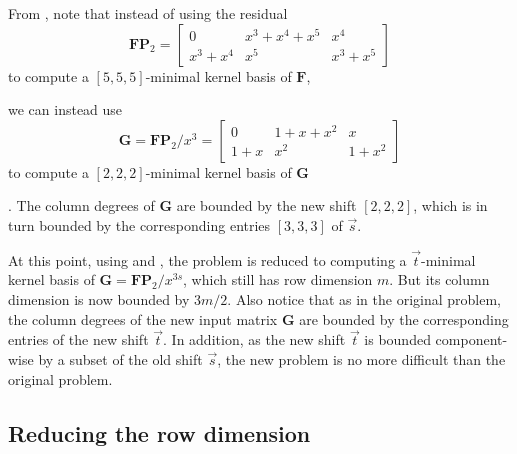 \begin{example}
\label{exm:reducingDegree}From ,
note that instead of using the residual 
\[
\mathbf{F}\mathbf{P}_{2}=\left[\begin{array}{ccc}
0 & x^{3}+x^{4}+x^{5} & x^{4}\\
x^{3}+x^{4} & x^{5} & x^{3}+x^{5}
\end{array}\right]
\]
 to compute a $[5,5,5]$-minimal kernel basis of $\mathbf{F}$,%
\begin{comment}
$\left(\mathbf{F}\mathbf{P}_{2},\tau,[5,5,5]\right)$-basis,
\end{comment}
{} we can instead use 
\[
\mathbf{G}=\mathbf{F}\mathbf{P}_{2}/x^{3}=\left[\begin{array}{ccc}
0 & 1+x+x^{2} & x\\
1+x & x^{2} & 1+x^{2}
\end{array}\right]
\]
 to compute a $[2,2,2]$-minimal kernel basis of $\mathbf{G}$%
\begin{comment}
$\left(\mathbf{G},\tau,[2,2,2]\right)$-basis
\end{comment}
. The column degrees of $\mathbf{G}$ are bounded by the new shift
$\left[2,2,2\right]$, which is in turn bounded by the corresponding
entries $\left[3,3,3\right]$ of $\vec{s}$. 
\end{example}
At this point, using 
and , the problem
is reduced to computing a $\vec{t}$-minimal kernel basis of $\mathbf{G}=\mathbf{F}\mathbf{P}_{2}/x^{3s}$,
which still has row dimension $m$. But its column dimension is now
bounded by $3m/2$. Also notice that as in the original problem, the
column degrees of the new input matrix $\mathbf{G}$ are bounded by
the corresponding entries of the new shift $\vec{t}$. In addition,
as the new shift $\vec{t}$ is bounded component-wise by a subset
of the old shift $\vec{s}$, the new problem is no more difficult
than the original problem.


\subsection{\label{sub:continueComputingNullspaceBasisByRows}Reducing the row
dimension }

